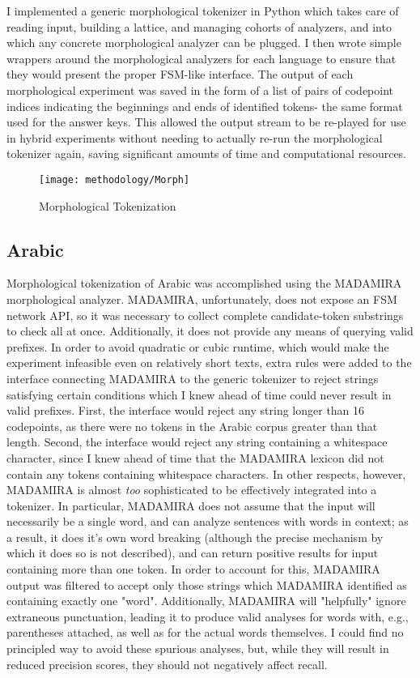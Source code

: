 I implemented a generic morphological tokenizer in Python which takes care of reading input, building a lattice, and managing cohorts of analyzers, and into which any concrete morphological analyzer can be plugged. I then wrote simple wrappers around the morphological analyzers for each language to ensure that they would present the proper FSM-like interface.
The output of each morphological experiment was saved in the form of a list of pairs of codepoint indices indicating the beginnings and ends of identified tokens- the same format used for the answer keys. This allowed the output stream to be re-played for use in hybrid experiments without needing to actually re-run the morphological tokenizer again, saving significant amounts of time and computational resources.

\begin{figure}[ht!]
	\texttt{[image: methodology/Morph]}
	\caption{Morphological Tokenization}
	\label{morphdiagram}
\end{figure}

\subsection{Arabic}
Morphological tokenization of Arabic was accomplished using the MADAMIRA morphological analyzer\cite{pasha14}. MADAMIRA, unfortunately, does not expose an FSM network API, so it was necessary to collect complete candidate-token substrings to check all at once. Additionally, it does not provide any means of querying valid prefixes. In order to avoid quadratic or cubic runtime, which would make the experiment infeasible even on relatively short texts, extra rules were added to the interface connecting MADAMIRA to the generic tokenizer to reject strings satisfying certain conditions which I knew ahead of time could never result in valid prefixes. First, the interface would reject any string longer than 16 codepoints, as there were no tokens in the Arabic corpus greater than that length. Second, the interface would reject any string containing a whitespace character, since I knew ahead of time that the MADAMIRA lexicon did not contain any tokens containing whitespace characters.
In other respects, however, MADAMIRA is almost \textit{too} sophisticated to be effectively integrated into a tokenizer. In particular, MADAMIRA does not assume that the input will necessarily be a single word, and can analyze sentences with words in context; as a result, it does it's own word breaking (although the precise mechanism by which it does so is not described), and can return positive results for input containing more than one token. In order to account for this, MADAMIRA output was filtered to accept only those strings which MADAMIRA identified as containing exactly one "word". Additionally, MADAMIRA will "helpfully" ignore extraneous punctuation, leading it to produce valid analyses for words with, e.g., parentheses attached, as well as for the actual words themselves. I could find no principled way to avoid these spurious analyses, but, while they will result in reduced precision scores, they should not negatively affect recall.

